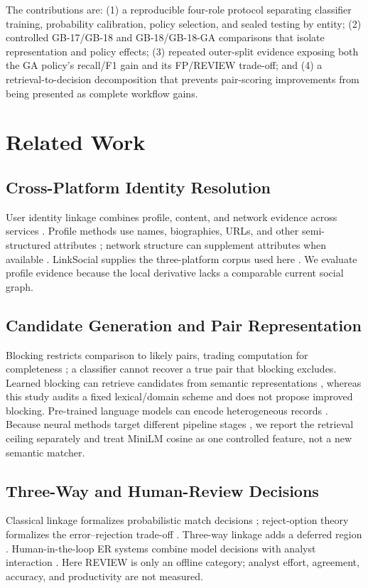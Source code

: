 \documentclass[conference]{IEEEtran}
\begin{document}
The contributions are: (1) a reproducible four-role protocol separating classifier training, probability calibration, policy selection, and sealed testing by entity; (2) controlled GB-17/GB-18 and GB-18/GB-18-GA comparisons that isolate representation and policy effects; (3) repeated outer-split evidence exposing both the GA policy's recall/F1 gain and its FP/REVIEW trade-off; and (4) a retrieval-to-decision decomposition that prevents pair-scoring improvements from being presented as complete workflow gains.

\section{Related Work}
\subsection{Cross-Platform Identity Resolution}
User identity linkage combines profile, content, and network evidence across services \cite{shu2017uilreview}. Profile methods use names, biographies, URLs, and other semi-structured attributes \cite{yao2023profile}; network structure can supplement attributes when available \cite{shu2017uilreview}. LinkSocial supplies the three-platform corpus used here \cite{linkSocial2018}. We evaluate profile evidence because the local derivative lacks a comparable current social graph.

\subsection{Candidate Generation and Pair Representation}
Blocking restricts comparison to likely pairs, trading computation for completeness \cite{papadakis2021blocking,li2020blocking}; a classifier cannot recover a true pair that blocking excludes. Learned blocking can retrieve candidates from semantic representations \cite{thirumuruganathan2021deepblocker}, whereas this study audits a fixed lexical/domain scheme and does not propose improved blocking. Pre-trained language models can encode heterogeneous records \cite{li2020ditto}. Because neural methods target different pipeline stages \cite{barlaug2021survey}, we report the retrieval ceiling separately and treat MiniLM cosine as one controlled feature, not a new semantic matcher.

\subsection{Three-Way and Human-Review Decisions}
Classical linkage formalizes probabilistic match decisions \cite{fellegi1969theory}; reject-option theory formalizes the error--rejection trade-off \cite{chow1970reject}. Three-way linkage adds a deferred region \cite{ouyang2019threeway}. Human-in-the-loop ER systems combine model decisions with analyst interaction \cite{qian2019systemer}. Here REVIEW is only an offline category; analyst effort, agreement, accuracy, and productivity are not measured.
\end{document}
